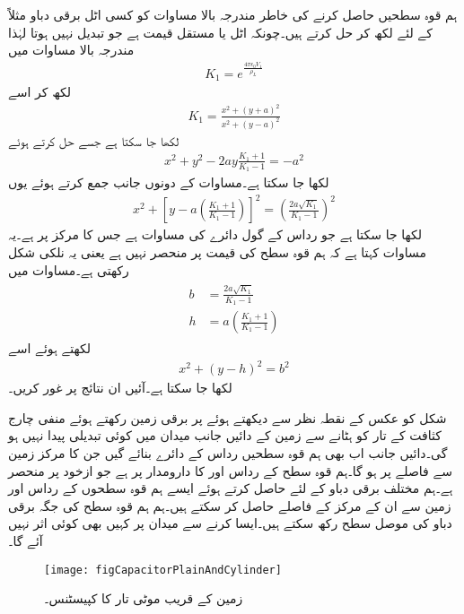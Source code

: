 ہم قوہ سطحیں حاصل کرنے کی خاطر مندرجہ بالا مساوات کو کسی اٹل برقی دباو مثلاً  کے لئے لکھ کر حل کرتے ہیں۔چونکہ  اٹل یا مستقل قیمت ہے جو تبدیل نہیں ہوتا لہٰذا مندرجہ بالا مساوات میں
\begin{align}\label{مساوات_کپیسٹر_زمین_موٹی_تار_جزوی_مستقل}
K_1=e^{\frac{4\pi\epsilon_0 V_1}{\rho_L}}
\end{align}
لکھ کر اسے 
\begin{align*}
K_1=\frac{x^2+(y+a)^2}{x^2+(y-a)^2}
\end{align*}
لکھا جا سکتا ہے جسے حل کرتے ہوئے
\begin{align*}
x^2+y^2-2ay \frac{K_1+1}{K_1-1} =-a^2
\end{align*}
لکھا جا سکتا ہے۔مساوات کے دونوں جانب  جمع کرتے ہوئے یوں
\begin{align}\label{مساوات_کپیسٹر_دو_تار_کپیسٹر_بنیادی}
x^2+\left[y-a\left(\frac{K_1+1}{K_1-1}\right) \right]^2=\left(\frac{2a\sqrt{K_1}}{K_1-1} \right)^2
\end{align}
لکھا جا سکتا ہے جو رداس  کے  گول دائرے کی مساوات ہے جس کا مرکز  پر ہے۔یہ مساوات کہتا ہے کہ ہم قوہ سطح  کی قیمت پر منحصر نہیں ہے یعنی یہ نلکی شکل رکھتی ہے۔مساوات  میں
\begin{gather}
\begin{aligned}\label{مساوات_کپیسٹر_رداس_زمین_سے_فاصلہ}
b&=\frac{2a\sqrt{K_1}}{K_1-1}\\
h&=a\left(\frac{K_1+1}{K_1-1}\right)
\end{aligned}
\end{gather}
لکھتے ہوئے اسے
\begin{align}\label{مساوات_کپیسٹر_دو_تار_کپیسٹر_عمومی_شکل}
x^2+(y-h)^2=b^2
\end{align}
لکھا جا سکتا ہے۔آئیں ان نتائج پر غور کریں۔

شکل  کو عکس کے نقطہ نظر سے دیکھتے  ہوئے  پر برقی زمین رکھتے ہوئے  منفی چارج کثافت کے تار کو ہٹانے سے زمین کے دائیں جانب میدان میں کوئی تبدیلی پیدا نہیں ہو گی۔دائیں جانب اب بھی ہم قوہ سطحیں  رداس کے دائرے بنائے گیں جن کا مرکز زمین سے  فاصلے پر ہو گا۔ہم قوہ سطح کے رداس اور  کا دارومدار  پر ہے جو ازخود  پر منحصر ہے۔ہم مختلف برقی دباو  کے لئے  حاصل کرتے ہوئے ایسے ہم قوہ سطحوں کے رداس اور زمین سے  ان کے مرکز کے فاصلے حاصل کر سکتے ہیں۔ہم  ہم قوہ سطح کی جگہ  برقی دباو کی موصل سطح رکھ سکتے ہیں۔ایسا کرنے سے میدان پر کہیں بھی کوئی اثر نہیں آئے گا۔ 
\begin{figure}
\centering
\texttt{[image: figCapacitorPlainAndCylinder]}
\caption{زمین کے قریب موٹی تار کا کپیسٹنس۔}
\label{شکل_کپیسٹر_زمین_کے_قریب_موٹی_تار}
\end{figure}

